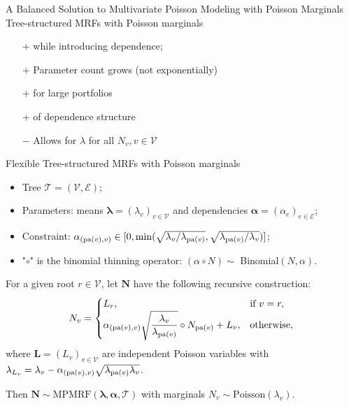 \documentclass[11pt,xcolor={dvipsnames},hyperref={pdftex,pdfpagemode=UseNone,hidelinks,pdfdisplaydoctitle=true},usepdftitle=false]{beamer}
\begin{document}
\begin{frame}{A Balanced Solution to Multivariate Poisson Modeling with Poisson Marginals}
Tree-structured MRFs with Poisson marginals \citep{cote2025tree} 
\begin{itemize}
        \item[+]  while introducing dependence;
        \vfill
        \item[+] Parameter count grows  
        (not exponentially)
        \vfill
        \item[+]  for large portfolios
        \vfill
        \item[+]  of dependence structure
        \vfill
        \item[$-$] Allows for  $\lambda$ for all $N_v, v \in \mathcal{V}$ 
\end{itemize}
\end{frame}
\begin{frame}{Flexible Tree-structured MRFs with Poisson marginals}
    \begin{itemize}
            \item Tree $\mathcal{T} = (\mathcal{V}, \mathcal{E})$;
            \item Parameters: means $\boldsymbol{\lambda} = (\lambda_v)_{v \in \mathcal{V}}$ and dependencies $\boldsymbol{\alpha} = (\alpha_e)_{e \in \mathcal{E}}$;
            \item Constraint: $\alphav{v} \in [0, \min(\sqrt{{\lambda_{v}}/{\lambda_{\pa{v}}}}, \sqrt{{\lambda_{\pa{v}}}/{\lambda_{v}}})]$;
         \item  "$\circ$" is the binomial thinning operator: $(\alpha\circ N) \sim$ Binomial$(N,\alpha)$.
    \end{itemize}
    \pause
\begin{theorem}
For a given root $r \in \mathcal{V}$, let $\boldsymbol{N}$ have the following recursive construction:
        \begin{equation*}
        N_v = 
        \begin{cases}
        L_r, & \text{if } v = r, \\ 
        \alphav{v} \sqrt{\dfrac{\lambda_v}{\lambda_{\pa{v}}}} \circ N_{\pa{v}} + L_v, & \text{otherwise},
        \end{cases}
        \vspace{-0.1cm}
        \end{equation*}
        where $\boldsymbol{L} = (L_v)_{v\in\mathcal{V}}$ are independent Poisson variables with $\lambda_{L_v} = \lambda_v- \alpha_{(\mathrm{pa}(v), v)}\sqrt{\lambda_{\mathrm{pa}(v)}\lambda_v}$.
        
        Then $\boldsymbol{N} \sim \text{MPMRF}(\boldsymbol{\lambda}, \boldsymbol{\alpha}, \mathcal{T})$ with marginals $N_v \sim \text{Poisson}(\lambda_v)$.
\end{theorem}
    

\end{frame}
\end{document}
